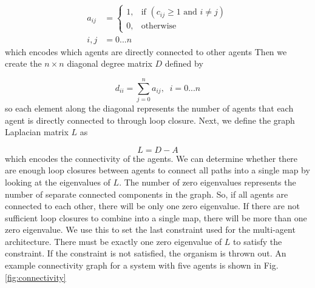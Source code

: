 \documentclass[letterpaper, 10 pt, conference]{ieeeconf}  %
\begin{document}
\begin{align}
  a_{ij} &=
  \begin{cases}
    1, & \text{if } (c_{ij} \geq 1 \text{ and } i \neq j)\\
    0, & \text{otherwise}
  \end{cases}\\
  i,j &=0 ...n \nonumber
\end{align}
%
which encodes which agents are directly connected to other agents
Then we create the $n \times n$ diagonal degree matrix $D$ defined by

\begin{equation}
  d_{ii} = \sum_{j=0}^{n} a_{ij},\;\; i = 0 ... n \nonumber
\end{equation}
%
so each element along the diagonal represents the number of agents that each agent is directly connected to through loop closure. Next, we define the graph Laplacian matrix $L$ as

\begin{equation}
  L = D-A
\end{equation}
%
which encodes the connectivity of the agents. We can determine whether there are enough loop closures between agents to connect all paths into a single map by looking at the eigenvalues of $L$. The number of zero eigenvalues represents the number of separate connected components in the graph. So, if all agents are connected to each other, there will be only one zero eigenvalue. If there are not sufficient loop closures to combine into a single map, there will be more than one zero eigenvalue. We use this to set the last constraint used for the multi-agent architecture. There must be exactly one zero eigenvalue of $L$ to satisfy the constraint. If the constraint is not satisfied, the organism is thrown out. An example connectivity graph for a system with five agents is shown in Fig. \ref{fig:connectivity}
\end{document}
